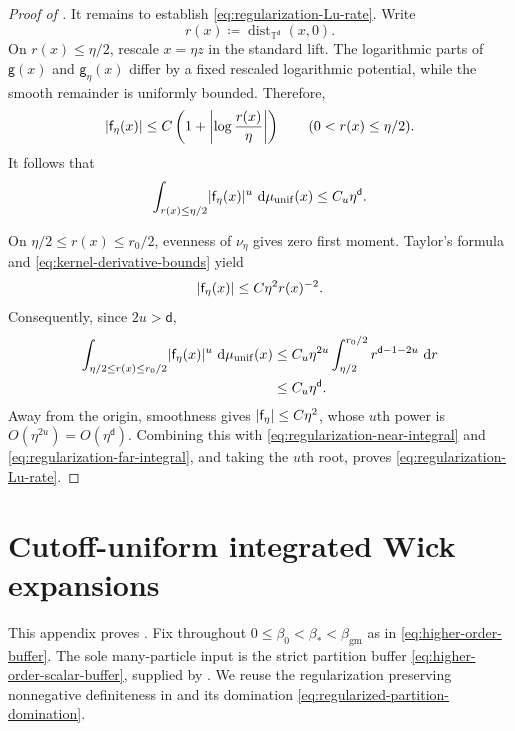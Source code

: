 \documentclass[11pt,reqno]{amsart}
\numberwithin{equation}{section}
\theoremstyle{plain}
\theoremstyle{definition}
\DeclarePairedDelimiter{\abs}{\lvert}{\rvert}
\renewcommand{\d}{\mathsf d}
\newcommand{\dd}{\mathop{}\!\mathrm d}
\newcommand{\T}{\mathbb T}
\newcommand{\be}{\beta}
\newcommand{\g}{\mathsf g}
\newcommand{\f}{\mathsf f}
\newcommand{\muunif}{\mu_{\mathrm{unif}}}
\newcommand{\gm}{\mathrm{gm}}
\begin{document}
\begin{proof}[Proof of ]
It remains to establish \eqref{eq:regularization-Lu-rate}.  Write
\begin{equation}
 r(x)\coloneqq\operatorname{dist}_{\T^{\d}}(x,0).
 \label{eq:regularization-torus-distance}
\end{equation}
On $r(x)\leq\eta/2$, rescale $x=\eta z$ in the standard lift.  The logarithmic parts of $\g(x)$ and $\g_{\eta}(x)$ differ by a fixed rescaled logarithmic potential, while the smooth remainder is uniformly bounded.  Therefore,
\begin{equation}
 \abs{\f_{\eta}(x)}
 \leq C\left(1+
 \abs*{\log\frac{r(x)}\eta}\right)
 \qquad(0<r(x)\leq\eta/2).
 \label{eq:regularization-near-pointwise}
\end{equation}
It follows that
\begin{equation}
 \int_{r(x)\leq\eta/2}\abs{\f_{\eta}(x)}^u\,\dd\muunif(x)
 \leq C_u\eta^{\d}.
 \label{eq:regularization-near-integral}
\end{equation}

On $\eta/2\leq r(x)\leq r_0/2$, evenness of $\nu_\eta$ gives zero first moment.  Taylor's formula and \eqref{eq:kernel-derivative-bounds} yield
\begin{equation}
 \abs{\f_{\eta}(x)}
 \leq C\eta^2r(x)^{-2}.
 \label{eq:regularization-far-pointwise}
\end{equation}
Consequently, since $2u>\d$,
\begin{align}
 \int_{\eta/2\leq r(x)\leq r_0/2}
 \abs{\f_{\eta}(x)}^u\,\dd\muunif(x)
 &\leq C_u\eta^{2u}
 \int_{\eta/2}^{r_0/2}r^{\d-1-2u}\,\dd r
 \notag\\
 &\leq C_u\eta^{\d}.
 \label{eq:regularization-far-integral}
\end{align}
Away from the origin, smoothness gives $\abs{\f_{\eta}}\leq C\eta^2$, whose $u$th power is $O(\eta^{2u})=O(\eta^{\d})$.  Combining this with \eqref{eq:regularization-near-integral} and \eqref{eq:regularization-far-integral}, and taking the $u$th root, proves \eqref{eq:regularization-Lu-rate}.
\end{proof}

\section{Cutoff-uniform integrated Wick expansions}
\label{app:higher-order-replica-expansions}

This appendix proves .  Fix throughout $0\leq\be_0<\be_*<\beta_{\gm}$ as in \eqref{eq:higher-order-buffer}.  The sole many-particle input is the strict partition buffer \eqref{eq:higher-order-scalar-buffer}, supplied by .  We reuse the regularization preserving nonnegative definiteness in  and its domination \eqref{eq:regularized-partition-domination}.
\end{document}
